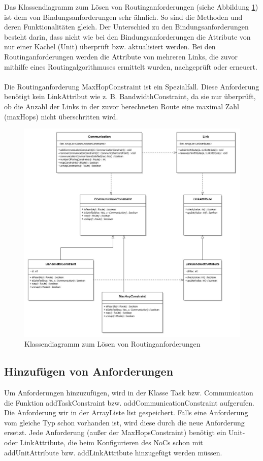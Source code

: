 Das Klassendiagramm zum Lösen von Routinganforderungen (siehe Abbildung \ref{fig:klRoute}) ist dem von Bindungsanforderungen sehr ähnlich. So sind die Methoden und deren Funktionalitäten gleich. Der Unterschied zu den Bindungsanforderungen besteht darin, dass nicht wie bei den Bindungsanforderungen die Attribute von nur einer Kachel (Unit) überprüft bzw. aktualisiert werden. Bei den Routinganforderungen werden die Attribute von mehreren Links, die zuvor mithilfe eines Routingalgorithmuses ermittelt  wurden, nachgeprüft oder erneuert. \\
\\
Die Routinganforderung MaxHopConstraint ist ein Spezialfall. Diese Anforderung benötigt kein LinkAttribut wie z. B. BandwidthConstraint, da sie nur überprüft, ob die Anzahl der Links in der zuvor berechneten Route eine maximal Zahl (maxHops) nicht überschritten wird.
\begin{figure}[H]\centering
  \includegraphics[width = 150mm]{bilder/communication-link.jpg}
  \caption{Klassendiagramm zum Lösen von Routinganforderungen}\label{fig:klRoute}
\end{figure}

\subsection{Hinzufügen von Anforderungen}
Um Anforderungen hinzuzufügen, wird in der Klasse Task bzw. Communication die Funktion addTaskConstraint bzw. addCommunicationConstraint aufgerufen. Die Anforderung wir in der ArrayListe list gespeichert. Falls eine Anforderung vom gleiche Typ schon vorhanden ist, wird diese durch die neue Anforderung ersetzt. Jede Anforderung (außer der MaxHopsConstraint) benötigt ein Unit- oder LinkAttribute, die beim Konfigurieren des NoCs schon mit addUnitAttribute bzw. addLinkAttribute hinzugefügt werden müssen.

